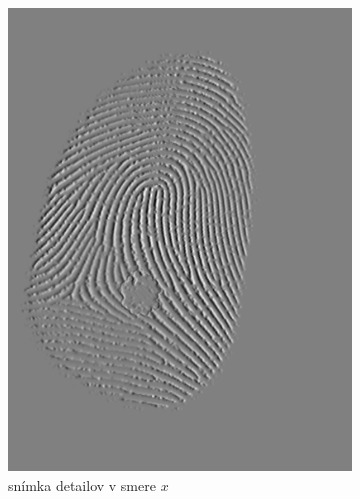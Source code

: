   \begin{figure}[h]
    \centering
    \begin{subfigure}[b]{0.3\linewidth}
      \includegraphics[width=\linewidth]{obrazky-figures/dX.png}
      \caption{snímka detailov v smere $x$}
    \end{subfigure}
    \hfill
    \begin{subfigure}[b]{0.3\linewidth}

\end{subfigure}
\end{figure}
